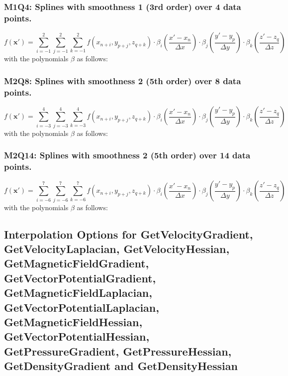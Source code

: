 \documentclass[11pt]{article}
\begin{document}
\subsubsection*{M1Q4: Splines with smoothness 1 (3rd order) over 4 data points.}
\begin{equation}
    f(\mathbf{x}') =
    \sum_{i=-1}^2 \sum_{j=-1}^2 \sum_{k=-1}^2
    f(x_{n+i}, y_{p+j}, z_{q+k})
    \cdot \beta_i\left(\frac{x' - x_n}{\Delta x}\right)
    \cdot \beta_j\left(\frac{y' - y_p}{\Delta y}\right)
    \cdot \beta_k\left(\frac{z' - z_q}{\Delta z}\right)
\end{equation}
with the polynomials $\beta$ as follows:

\subsubsection*{M2Q8: Splines with smoothness 2 (5th order) over 8 data points.}
\begin{equation}
    f(\mathbf{x}') =
    \sum_{i=-3}^4 \sum_{j=-3}^4 \sum_{k=-3}^4
    f(x_{n+i}, y_{p+j}, z_{q+k})
    \cdot \beta_i\left(\frac{x' - x_n}{\Delta x}\right)
    \cdot \beta_j\left(\frac{y' - y_p}{\Delta y}\right)
    \cdot \beta_k\left(\frac{z' - z_q}{\Delta z}\right)
\end{equation}
with the polynomials $\beta$ as follows:

\subsubsection*{M2Q14: Splines with smoothness 2 (5th order) over 14 data points.}
\begin{equation}
    f(\mathbf{x}') =
    \sum_{i=-6}^7 \sum_{j=-6}^7 \sum_{k=-6}^7
    f(x_{n+i}, y_{p+j}, z_{q+k})
    \cdot \beta_i\left(\frac{x' - x_n}{\Delta x}\right)
    \cdot \beta_j\left(\frac{y' - y_p}{\Delta y}\right)
    \cdot \beta_k\left(\frac{z' - z_q}{\Delta z}\right)
\end{equation}
with the polynomials $\beta$ as follows:


\subsection{Interpolation Options for GetVelocityGradient, GetVelocityLaplacian, GetVelocityHessian, GetMagneticFieldGradient, GetVectorPotentialGradient,
 GetMagneticFieldLaplacian, GetVectorPotentialLaplacian, GetMagneticFieldHessian, GetVectorPotentialHessian, GetPressureGradient, GetPressureHessian, GetDensityGradient
 and GetDensityHessian}
\end{document}
